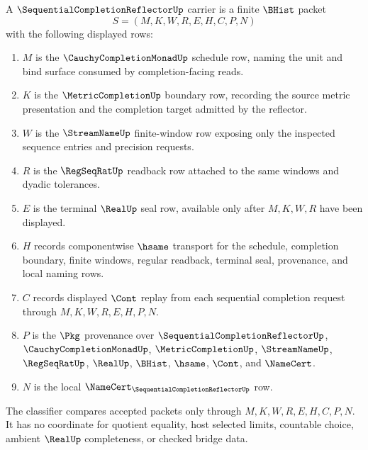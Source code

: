 \begin{definition}
\label{def:sequential-completion-reflector-carrier}
A $\SequentialCompletionReflectorUp$ carrier is a finite $\BHist$ packet
$$
S=(M,K,W,R,E,H,C,P,N)
$$
with the following displayed rows:
\begin{enumerate}
\item $M$ is the $\CauchyCompletionMonadUp$ schedule row, naming the unit and bind surface consumed by completion-facing reads.
\item $K$ is the $\MetricCompletionUp$ boundary row, recording the source metric presentation and the completion target admitted by the reflector.
\item $W$ is the $\StreamNameUp$ finite-window row exposing only the inspected sequence entries and precision requests.
\item $R$ is the $\RegSeqRatUp$ readback row attached to the same windows and dyadic tolerances.
\item $E$ is the terminal $\RealUp$ seal row, available only after $M,K,W,R$ have been displayed.
\item $H$ records componentwise $\hsame$ transport for the schedule, completion boundary, finite windows, regular readback, terminal seal, provenance, and local naming rows.
\item $C$ records displayed $\Cont$ replay from each sequential completion request through $M,K,W,R,E,H,P,N$.
\item $P$ is the $\Pkg$ provenance over $\SequentialCompletionReflectorUp$, $\CauchyCompletionMonadUp$, $\MetricCompletionUp$, $\StreamNameUp$, $\RegSeqRatUp$, $\RealUp$, $\BHist$, $\hsame$, $\Cont$, and $\NameCert$.
\item $N$ is the local $\NameCert_{\SequentialCompletionReflectorUp}$ row.
\end{enumerate}
The classifier compares accepted packets only through $M,K,W,R,E,H,C,P,N$. It has no coordinate for quotient equality, host selected limits, countable choice, ambient $\RealUp$ completeness, or checked bridge data.
\end{definition}

